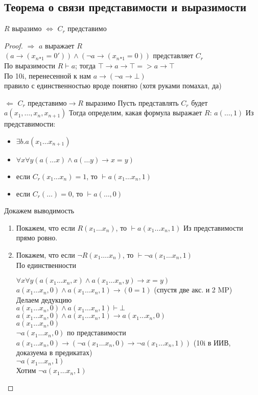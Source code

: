 \subsection{Теорема о связи представимости и выразимости}
\label{sec-11-2}
\begin{theorem}
$R$ выразимо $\Leftrightarrow$ $C_r$ представимо
\end{theorem}
\begin{proof}
$\Rightarrow$ $a$ выражает $R$\\
$(a \to (x_n₊_1=0')) \land (\lnot a \to (x_n₊_1=0))$
представляет $C_r$\\
По выразимости $R \vdash a$; тогда $\top\to a\to \top => a\to \top$\\
По 10i, перенесенной к нам $a \to (\lnot a \to \bot)$\\
правило с единственностью вроде понятно (хотя руками помахал, да)

$\Leftarrow$ $C_r \text{ представимо} \to R \text{ выразимо}$
Пусть представлять $C_r$ будет
$a(x_1, \dotsc, x_n,x_{n+1})$
Тогда определим, какая формула выражает $R$:
$a(\dotsc, 1)$
Из представимости:
\begin{itemize}
\item $\exists b.a(x_1\dots x_{n+1})$
\item $\forall x\forall y(a(\dots x) \land a(\dots  y) \to x = y)$
\item если $C_r(x_1\dots x_n) = 1$, то $\vdash a(x_1\dots x_n,1)$
\item если $C_r(\dots) = 0$, то $\vdash a(\dotsc, 0)$
\end{itemize}
Докажем выводимость
\begin{enumerate}
\item Покажем, что если $R(x_1\dots x_n)$, то $\vdash a(x_1\dots x_n, 1)$
Из представимости прямо ровно.
\item Покажем, что если $\lnot R(x_1\dots .x_n)$, то $\vdash \lnot a(x_1\dots x_n, 1)$\\
По единственности

$\forall x\forall y(a(x_1\dots x_n, x) \land a(x_1\dots x_n, y) \to x = y)$\\
$a(x_1\dots x_n, 0) \land a(x_1\dots x_n, 1) \to (0 = 1)$ (спустя две акс. и 2 MP)\\
Делаем дедукцию\\
$a(x_1\dots x_n, 0) \land a(x_1\dots x_n, 1) \vdash \bot$\\
$a(x_1\dots x_n, 0) \land a(x_1\dots x_n, 1) \to a(x_1\dots x_n, 0)$\\
$a(x_1\dots x_n, 0)$\\
$\lnot a(x_1\dots x_n, 0)$ по представимости
$a(x_1\dots x_n, 0) \to (\lnot a(x_1\dots x_n, 0) \to \lnot a(x_1\dots x_n, 1))$ (10i в ИИВ, доказуема в предикатах)\\
$\lnot a(x_1\dots x_n, 1)$\\
Хотим $\lnot a(x_1\dots x_n, 1)$
\end{enumerate}
\end{proof}

